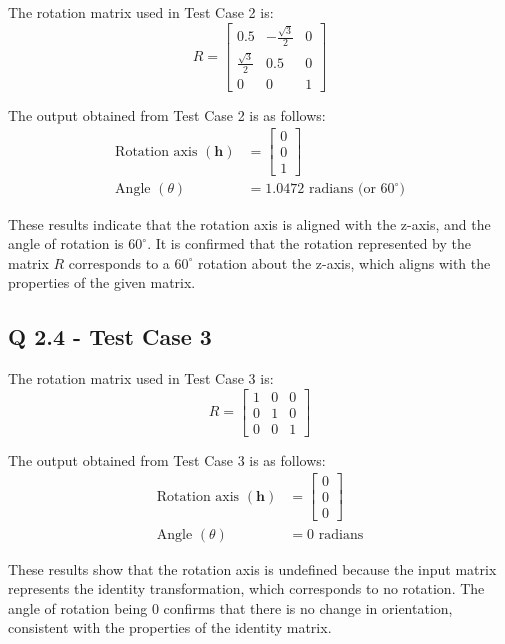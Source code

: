 The rotation matrix used in Test Case 2 is:
\[
R = 
\begin{bmatrix}
0.5 & -\frac{\sqrt{3}}{2} & 0 \\
\frac{\sqrt{3}}{2} & 0.5 & 0 \\
0 & 0 & 1
\end{bmatrix}
\]

The output obtained from Test Case 2 is as follows:
\begin{align*}
\text{Rotation axis } (\mathbf{h}) &= 
\begin{bmatrix}
0 \\
0 \\
1
\end{bmatrix} \\
\text{Angle } (\theta) &= 1.0472 \text{ radians (or } 60^\circ\text{)}
\end{align*}

These results indicate that the rotation axis is aligned with the z-axis, and the angle of rotation is \( 60^\circ \). It is confirmed that the rotation represented by the matrix \( R \) corresponds to a \( 60^\circ \) rotation about the z-axis, which aligns with the properties of the given matrix.

\subsection{Q 2.4 - Test Case 3}

The rotation matrix used in Test Case 3 is:
\[
R = 
\begin{bmatrix}
1 & 0 & 0 \\
0 & 1 & 0 \\
0 & 0 & 1
\end{bmatrix}
\]

The output obtained from Test Case 3 is as follows:
\begin{align*}
\text{Rotation axis } (\mathbf{h}) &= 
\begin{bmatrix}
0 \\
0 \\
0
\end{bmatrix} \\
\text{Angle } (\theta) &= 0 \text{ radians}
\end{align*}

These results show that the rotation axis is undefined because the input matrix represents the identity transformation, which corresponds to no rotation. The angle of rotation being \( 0 \) confirms that there is no change in orientation, consistent with the properties of the identity matrix.

